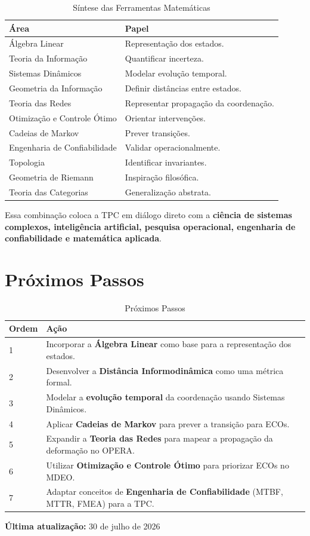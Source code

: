 \documentclass[12pt,a4paper]{article}
\begin{document}
\begin{table}[h]
\centering
\caption{Síntese das Ferramentas Matemáticas}
\begin{tabularx}{\textwidth}{p{4cm}p{7.5cm}}
\toprule
\textbf{Área} & \textbf{Papel} \\
\midrule
Álgebra Linear & Representação dos estados. \\
Teoria da Informação & Quantificar incerteza. \\
Sistemas Dinâmicos & Modelar evolução temporal. \\
Geometria da Informação & Definir distâncias entre estados. \\
Teoria das Redes & Representar propagação da coordenação. \\
Otimização e Controle Ótimo & Orientar intervenções. \\
Cadeias de Markov & Prever transições. \\
Engenharia de Confiabilidade & Validar operacionalmente. \\
Topologia & Identificar invariantes. \\
Geometria de Riemann & Inspiração filosófica. \\
Teoria das Categorias & Generalização abstrata. \\
\bottomrule
\end{tabularx}
\end{table}

Essa combinação coloca a TPC em diálogo direto com a \textbf{ciência de sistemas complexos, inteligência artificial, pesquisa operacional, engenharia de confiabilidade e matemática aplicada}.

\section{Próximos Passos}

\begin{table}[h]
\centering
\caption{Próximos Passos}
\begin{tabularx}{\textwidth}{p{1cm}p{8.5cm}}
\toprule
\textbf{Ordem} & \textbf{Ação} \\
\midrule
1 & Incorporar a \textbf{Álgebra Linear} como base para a representação dos estados. \\
2 & Desenvolver a \textbf{Distância Informodinâmica} como uma métrica formal. \\
3 & Modelar a \textbf{evolução temporal} da coordenação usando Sistemas Dinâmicos. \\
4 & Aplicar \textbf{Cadeias de Markov} para prever a transição para ECOs. \\
5 & Expandir a \textbf{Teoria das Redes} para mapear a propagação da deformação no OPERA. \\
6 & Utilizar \textbf{Otimização e Controle Ótimo} para priorizar ECOs no MDEO. \\
7 & Adaptar conceitos de \textbf{Engenharia de Confiabilidade} (MTBF, MTTR, FMEA) para a TPC. \\
\bottomrule
\end{tabularx}
\end{table}

\vspace{1cm}
\textbf{Última atualização:} 30 de julho de 2026
\end{document}
